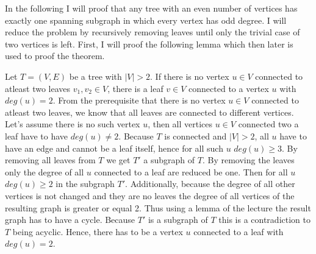 \documentclass[a4paper]{article}
\begin{document}
	\begin{solution}{6}
		In the following I will proof that any tree with an even number of vertices has exactly one spanning subgraph in which every vertex has odd degree. 
		I will reduce the problem by recursively removing leaves until only the trivial case of two vertices is left. 
		First, I will proof the following lemma which then later is used to proof the theorem. 
			
		\begin{lemma}{Let $T=(V,E)$ be a tree with $|V|>2$. If there is no vertex $u \in V$ connected to atleast two leaves $v_1, v_2 \in V$, there is a leaf $v \in V$ connected to a vertex $u$ with $deg(u) = 2$.}
			From the prerequisite that there is no vertex $u \in V$ connected to atleast two leaves, we know that all leaves are connected to different vertices. 
			Let's assume there is no such vertex $u$, then all vertices $u \in V$ connected two a leaf have to have $deg(u) \neq 2$. 
			Because $T$ is connected and $|V|>2$, all $u$ have to have an edge and cannot be a leaf itself, hence for all such $u$ $deg(u) \geq 3$. 
			By removing all leaves from $T$ we get $T'$ a subgraph of $T$. By removing the leaves only the degree of all $u$ connected to a leaf are reduced be one. 
			Then for all $u$ $deg(u) \geq 2$ in the subgraph $T'$. 
			Additionally, because the degree of all other vertices is not changed and they are no leaves the degree of all vertices of the resulting graph is greater or equal 2. 
			Thus using a lemma of the lecture the result graph has to have a cycle. 
			Because $T'$ is a subgraph of $T$ this is a contradiction to $T$ being acyclic. 
			Hence, there has to be a vertex $u$ connected to a leaf with $deg(u)=2$. 		
		\end{lemma}
					

\end{solution}
\end{document}
